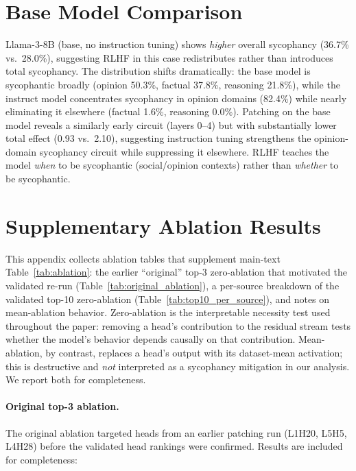 \documentclass{article}
\begin{document}
\FloatBarrier
\section{Base Model Comparison}
\label{app:base}

Llama-3-8B (base, no instruction tuning) shows \emph{higher} overall sycophancy (36.7\% vs.\ 28.0\%), suggesting RLHF in this case redistributes rather than introduces total sycophancy. The distribution shifts dramatically: the base model is sycophantic broadly (opinion 50.3\%, factual 37.8\%, reasoning 21.8\%), while the instruct model concentrates sycophancy in opinion domains (82.4\%) while nearly eliminating it elsewhere (factual 1.6\%, reasoning 0.0\%). Patching on the base model reveals a similarly early circuit (layers 0--4) but with substantially lower total effect (0.93 vs.\ 2.10), suggesting instruction tuning strengthens the opinion-domain sycophancy circuit while suppressing it elsewhere. RLHF teaches the model \emph{when} to be sycophantic (social/opinion contexts) rather than \emph{whether} to be sycophantic.

\FloatBarrier
\section{Supplementary Ablation Results}
\label{app:original_ablation}

This appendix collects ablation tables that supplement main-text Table~\ref{tab:ablation}: the earlier ``original'' top-3 zero-ablation that motivated the validated re-run (Table~\ref{tab:original_ablation}), a per-source breakdown of the validated top-10 zero-ablation (Table~\ref{tab:top10_per_source}), and notes on mean-ablation behavior. Zero-ablation is the interpretable necessity test used throughout the paper: removing a head's contribution to the residual stream tests whether the model's behavior depends causally on that contribution. Mean-ablation, by contrast, replaces a head's output with its dataset-mean activation; this is destructive and \emph{not} interpreted as a sycophancy mitigation in our analysis. We report both for completeness.

\paragraph{Original top-3 ablation.} The original ablation targeted heads from an earlier patching run (L1H20, L5H5, L4H28) before the validated head rankings were confirmed. Results are included for completeness:
\end{document}
